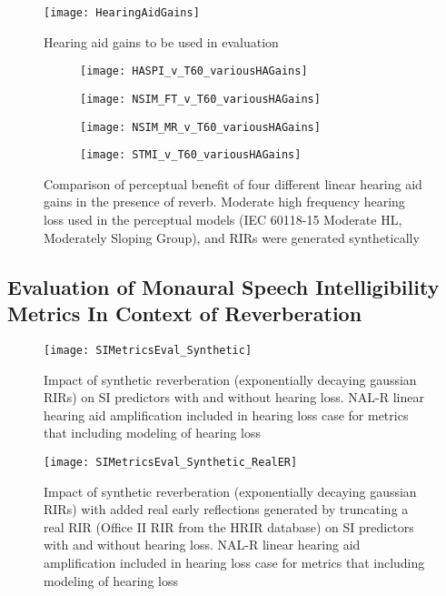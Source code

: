 \begin{figure}[H]
	\texttt{[image: HearingAidGains]}
	\centering
	\caption{Hearing aid gains to be used in evaluation}
	\label{fig:HA_Gains}
\end{figure}

\begin{figure}[H]
	\centering
	\begin{subfigure}[b]{0.49\textwidth}
		\centering
		\texttt{[image: HASPI\_v\_T60\_variousHAGains]}
	\end{subfigure}
	\hfill
	\begin{subfigure}[b]{0.49\textwidth}
		\centering
		\texttt{[image: NSIM\_FT\_v\_T60\_variousHAGains]}
	\end{subfigure}
	\hfill
	\begin{subfigure}[b]{0.49\textwidth}
		\centering
		\texttt{[image: NSIM\_MR\_v\_T60\_variousHAGains]}
	\end{subfigure}
	\hfill
	\begin{subfigure}[b]{0.49\textwidth}
		\centering
		\texttt{[image: STMI\_v\_T60\_variousHAGains]}
	\end{subfigure}
	\hfill
	\caption{Comparison of perceptual benefit of four different linear hearing aid gains in the presence of reverb. Moderate high frequency hearing loss used in the perceptual models (IEC 60118-15 Moderate HL, Moderately Sloping Group), and RIRs were generated synthetically}
	\label{fig:HA_GainComparison}
\end{figure}



\subsection{Evaluation of Monaural Speech Intelligibility Metrics In Context of Reverberation}


\begin{figure}[H]
	\texttt{[image: SIMetricsEval\_Synthetic]}
	\centering
	\caption{Impact of synthetic reverberation (exponentially decaying gaussian RIRs) on SI predictors with and without hearing loss. NAL-R linear hearing aid amplification included in hearing loss case for metrics that including modeling of hearing loss}
	\label{fig:SIMetricsEval_Synthetic}
\end{figure}

\begin{figure}[H]
	\texttt{[image: SIMetricsEval\_Synthetic\_RealER]}
	\centering
	\caption{Impact of synthetic reverberation (exponentially decaying gaussian RIRs) with added real early reflections generated by truncating a real RIR  (Office II RIR from the HRIR database) on SI predictors with and without hearing loss. NAL-R linear hearing aid amplification included in hearing loss case for metrics that including modeling of hearing loss}
	\label{fig:SIMetricsEval_Synthetic_RealER}
\end{figure}

